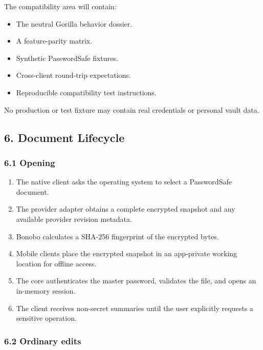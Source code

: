 \documentclass[
  letterpaper,
]{article}
\providecommand{\tightlist}{%
  \setlength{\itemsep}{0pt}\setlength{\parskip}{0pt}}
\begin{document}
The compatibility area will contain:

\begin{itemize}
\tightlist
\item
  The neutral Gorilla behavior dossier.
\item
  A feature-parity matrix.
\item
  Synthetic PasswordSafe fixtures.
\item
  Cross-client round-trip expectations.
\item
  Reproducible compatibility test instructions.
\end{itemize}

No production or test fixture may contain real credentials or personal vault data.

\subsection{6. Document Lifecycle}\label{6-document-lifecycle}

\subsubsection{6.1 Opening}\label{61-opening}

\begin{enumerate}
\def\labelenumi{\arabic{enumi}.}
\tightlist
\item
  The native client asks the operating system to select a PasswordSafe document.
\item
  The provider adapter obtains a complete encrypted snapshot and any available provider revision metadata.
\item
  Bonobo calculates a SHA-256 fingerprint of the encrypted bytes.
\item
  Mobile clients place the encrypted snapshot in an app-private working location for offline access.
\item
  The core authenticates the master password, validates the file, and opens an in-memory session.
\item
  The client receives non-secret summaries until the user explicitly requests a sensitive operation.
\end{enumerate}

\subsubsection{6.2 Ordinary edits}\label{62-ordinary-edits}
\end{document}
